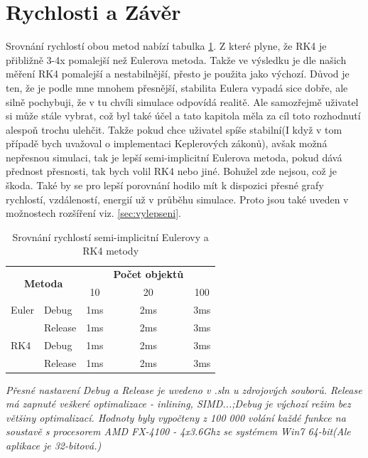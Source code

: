 \section{Rychlosti a Závěr}
Srovnání rychlostí obou metod nabízí tabulka \ref{tab:rychlost}. 
Z které plyne, že RK4 je přibližně 3-4x pomalejší než Eulerova metoda. Takže ve výsledku je dle našich měření RK4 pomalejší a nestabilnější, přesto je použita jako výchozí. Důvod je ten, že je podle mne mnohem přesnější, stabilita Eulera vypadá sice dobře, ale silně pochybuji, že v tu chvíli simulace odpovídá realitě. Ale samozřejmě uživatel si může stále vybrat, což byl také účel a tato kapitola měla za cíl toto rozhodnutí alespoň trochu ulehčit. Takže pokud chce uživatel spíše stabilní(I když v tom případě bych uvažoval o implementaci Keplerových zákonů), avšak možná nepřesnou simulaci, tak je lepší semi-implicitní Eulerova metoda, pokud dává přednost přesnosti, tak bych volil RK4 nebo jiné. Bohužel  zde nejsou, což je škoda. Také by se pro lepší porovnání hodilo mít k dispozici přesné grafy rychlostí, vzdáleností, energií už v průběhu simulace. Proto jsou také uveden v možnostech rozšíření viz. \ref{sec:vylepseni}. 
\begin{table}
	\centering
	\caption{Srovnání rychlostí semi-implicitní Eulerovy a RK4 metody}
	\label{tab:rychlost}
	\begin{tabular}{l l c c c}
		\hline\multicolumn{2}{c}{\multirow{2}{*}{\textbf{Metoda}}}& & \textbf{Počet objektů}\\ 
		&& 10 & 20 & 100\\
		\hline
		Euler&Debug&1ms&2ms&3ms\\
			 &Release&1ms&2ms&3ms\\\hline
		RK4&Debug&1ms&2ms&3ms\\
		&Release&1ms&2ms&3ms\\\hline
	\end{tabular}
	\newline
	\flushleft
	\textit{Přesné nastavení Debug a Release je uvedeno v .sln u zdrojových souborů. Release má zapnuté veškeré optimalizace - inlining, SIMD...;Debug je výchozí režim bez většiny optimalizací. Hodnoty byly vypočteny z 100 000 volání každé funkce na soustavě s procesorem AMD FX-4100 - 4x3.6Ghz se systémem Win7 64-bit(Ale aplikace je 32-bitová.)}
\end{table}
